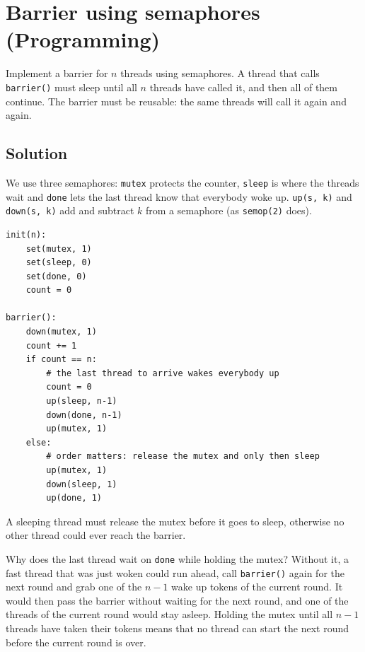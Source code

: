 \section {Barrier using semaphores (Programming)}

Implement a barrier for $n$ threads using semaphores.
A thread that calls \verb|barrier()| must sleep until all $n$ threads have called it, and then all of them continue.
The barrier must be reusable: the same threads will call it again and again.

\subsection{Solution}

We use three semaphores: \verb|mutex| protects the counter, \verb|sleep| is where the threads wait and
\verb|done| lets the last thread know that everybody woke up.
\verb|up(s, k)| and \verb|down(s, k)| add and subtract $k$ from a semaphore (as \verb|semop(2)| does).

\begin{verbatim}
init(n):
    set(mutex, 1)
    set(sleep, 0)
    set(done, 0)
    count = 0

barrier():
    down(mutex, 1)
    count += 1
    if count == n:
        # the last thread to arrive wakes everybody up
        count = 0
        up(sleep, n-1)
        down(done, n-1)
        up(mutex, 1)
    else:
        # order matters: release the mutex and only then sleep
        up(mutex, 1)
        down(sleep, 1)
        up(done, 1)
\end{verbatim}

A sleeping thread must release the mutex before it goes to sleep, otherwise no other thread could ever reach the barrier.

Why does the last thread wait on \verb|done| while holding the mutex?
Without it, a fast thread that was just woken could run ahead, call \verb|barrier()| again for the next round and grab one of the
$n-1$ wake up tokens of the current round. It would then pass the barrier without waiting for the next round, and one of the
threads of the current round would stay asleep. Holding the mutex until all $n-1$ threads have taken their tokens means that no
thread can start the next round before the current round is over.
